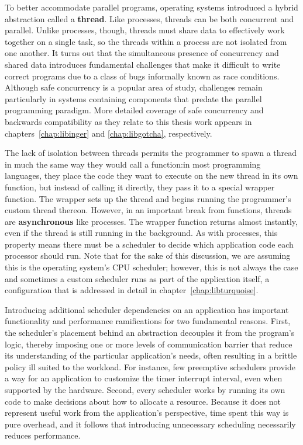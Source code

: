 \documentclass[12pt,letterpaper,openright]{report}
\begin{document}
To better accommodate parallel programs, operating systems introduced a hybrid
abstraction called a \textbf{thread}.  Like processes, threads can be both concurrent
and parallel.  Unlike processes, though, threads must share data to effectively
work together on a single task, so the threads within a process are not isolated from
one another.  It turns out that the simultaneous presence of concurrency and shared
data introduces fundamental challenges that make it difficult to write correct
programs due to a class of bugs informally known as race conditions.  Although safe
concurrency is a popular area of study, challenges remain particularly in systems
containing components that predate the parallel programming paradigm.  More detailed
coverage of safe concurrency and backwards compatibility as they relate to this
thesis work appears in chapters~\ref{chap:libinger} and \ref{chap:libgotcha},
respectively.

The lack of isolation between threads permits the programmer to spawn a thread in
much the same way they would call a function:\@ in most programming languages, they
place the code they want to execute on the new thread in its own function, but
instead of calling it directly, they pass it to a special wrapper function.  The
wrapper sets up the thread and begins running the programmer's custom thread thereon.
However, in an important break from functions, threads are \textbf{asynchronous} like
processes.  The wrapper function returns almost instantly, even if the thread is
still running in the background.  As with processes, this property means there must
be a scheduler to decide which application code each processor should run.  Note
that for the sake of this discussion, we are assuming this is the operating system's
CPU scheduler; however, this is not always the case and sometimes a custom scheduler
runs as part of the application itself, a configuration that is addressed in detail
in chapter~\ref{chap:libturquoise}.

Introducing additional scheduler dependencies on an application has important
functionality and performance ramifications for two fundamental reasons.  First, the
scheduler's placement behind an abstraction decouples it from the program's logic,
thereby imposing one or more levels of communication barrier that reduce its
understanding of the particular application's needs, often resulting in a brittle
policy ill suited to the workload.  For instance, few preemptive schedulers provide a
way for an application to customize the timer interrupt interval, even when supported
by the hardware.  Second, every scheduler works by running its own code to make
decisions about how to allocate a resource.  Because it does not represent useful
work from the application's perspective, time spent this way is pure overhead, and it
follows that introducing unnecessary scheduling necessarily reduces performance.
\end{document}
